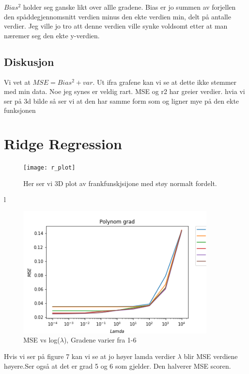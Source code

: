 \documentclass[norsk,a4paper,12pt]{article}
\begin{document}
$Bias^2$ holder seg ganske likt over allle gradene. Bias er jo summen av  forjellen den spåddegjennomsnitt  verdien minus den ekte verdien min, delt på antalle verdier. Jeg ville jo tro att denne verdien ville synke voldsomt etter at man næremer seg den ekte y-verdien. 
\subsection*{Diskusjon}
Vi vet at $MSE = Bias^2 + var$. Ut ifra grafene kan vi se at dette ikke stemmer med min data. Noe jeg synes er veldig rart. MSE og r2 har  greier verdier. hvia vi ser på 3d bilde så ser vi at den har samme form som og ligner mye på den ekte funksjonen



\section*{ Ridge Regression}
\begin{figure}[H]
\texttt{[image: r\_plot]}
\caption{Her ser vi 3D plot av frankfunskjsijone med støy normalt fordelt. }
\end{figure}
l

\begin{figure}[H]
\includegraphics[width=100mm]{MSE(R)}
\caption{MSE vs log($\lambda$), Gradene varier fra 1-6}
\end{figure}
Hvis vi ser på figure 7 kan vi se at jo høyer lamda verdier $\lambda$ blir MSE verdiene høyere.Ser også at det er grad 5 og 6 som  gjelder. Den halverer MSE scoren.
\end{document}
